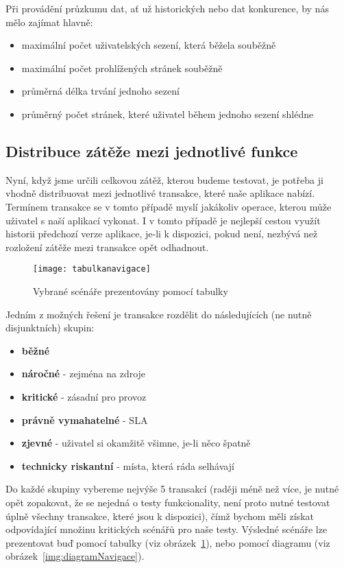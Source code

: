 \documentclass[122pt,oneside]{fithesis}
\begin{document}
Při provádění průzkumu dat, ať už historických nebo dat konkurence, by nás mělo zajímat hlavně:
\begin{itemize}
  \item maximální počet uživatelských sezení, která běžela souběžně
  \item maximální počet prohlížených stránek souběžně
  \item průměrná délka trvání jednoho sezení
  \item průměrný počet stránek, které uživatel během jednoho sezení shlédne
\end{itemize}

\subsection{Distribuce zátěže mezi jednotlivé funkce}

Nyní, když jsme určili celkovou zátěž, kterou budeme testovat, je potřeba ji vhodně distribuovat mezi jednotlivé transakce, které naše aplikace nabízí. Termínem transakce se v tomto případě myslí jakákoliv operace, kterou může uživatel s naší aplikací vykonat. I v tomto případě je nejlepší cestou využít historii předchozí verze aplikace, je-li k dispozici, pokud není, nezbývá než rozložení zátěže mezi transakce opět odhadnout. 

\begin{figure}[!ht]
\centering
\texttt{[image: tabulkanavigace]}
\caption{Vybrané scénáře prezentovány pomocí tabulky~\cite{molyneaux09}}
\label{img:tabulkaNavigace}
\end{figure}

Jedním z možných řešení je transakce rozdělit do následujících (ne nutně disjunktních) skupin:
\begin{itemize}
  \item {\bf běžné}
  \item {\bf náročné} - zejména na zdroje
  \item {\bf kritické} - zásadní pro provoz
  \item {\bf právně vymahatelné} - SLA
  \item {\bf zjevné} - uživatel si okamžitě všimne, je-li něco špatně
  \item {\bf technicky riskantní} - místa, která ráda selhávají
\end{itemize}

Do každé skupiny vybereme nejvýše 5 transakcí (raději méně než více, je nutné opět zopakovat, že se nejedná o testy funkcionality, není proto nutné testovat úplně všechny transakce, které jsou k dispozici), čímž bychom měli získat odpovídající množinu kritických scénářů pro naše testy. Výsledné scénáře lze prezentovat buď pomocí tabulky (viz obrázek~\ref{img:tabulkaNavigace}), nebo pomocí diagramu (viz obrázek~\ref{img:diagramNavigace}).
\end{document}
